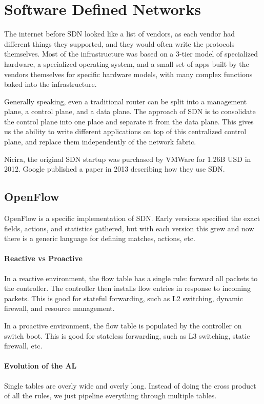 \documentclass{idc_msc}
\begin{document}
\section{Software Defined Networks}

The internet before SDN looked like a list of vendors, as each vendor had different things they supported, and they would often write the protocols themselves.
Most of the infrastructure was based on a 3-tier model of specialized hardware, a specialized operating system, and a small set of apps built by the vendors themselves for specific hardware models, with many complex functions baked into the infrastructure.

Generally speaking, even a traditional router can be split into a management plane, a control plane, and a data plane.
The approach of SDN is to consolidate the control plane into one place and separate it from the data plane.
This gives us the ability to write different applications on top of this centralized control plane, and replace them independently of the network fabric.

Nicira, the original SDN startup was purchased by VMWare for 1.26B USD in 2012.
Google published a paper\cite{Jain:2013:BEG:2534169.2486019} in 2013 describing how they use SDN.

\subsection{OpenFlow}

OpenFlow is a specific implementation of SDN.
Early versions specified the exact fields, actions, and statistics gathered, but with each version this grew and now there is a generic language for defining matches, actions, etc.

\paragraph{Reactive vs Proactive}

In a reactive environment, the flow table has a single rule: forward all packets to the controller.
The controller then installs flow entries in response to incoming packets.
This is good for stateful forwarding, such as L2 switching, dynamic firewall, and resource management.

In a proactive environment, the flow table is populated by the controller on switch boot.
This is good for stateless forwarding, such as L3 switching, static firewall, etc.

\paragraph{Evolution of the AL}

Single tables are overly wide and overly long.
Instead of doing the cross product of all the rules, we just pipeline everything through multiple tables.
\end{document}
